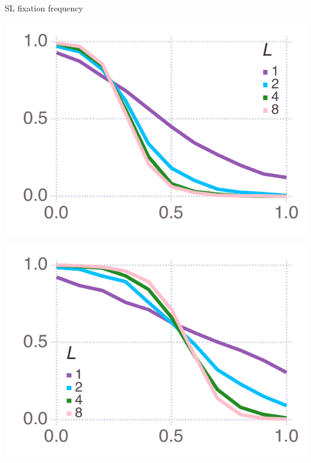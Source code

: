\documentclass[varwidth=true,crop=false]{standalone}
\begin{document}
    \begin{minipage}{3.75in}
    \begin{rotate}{90}
      {\parbox{3.0in}{
          \centering
          \vspace{-1.0em}\hspace{-2.5em}{\huge Low payoff $= 0.45$} \\[1em]
          {\huge SL fixation frequency}
      }}
    \end{rotate}%
    \hspace{2em}
      \includegraphics[width=\textwidth]{mean_social_learner_over_u_lowpayoff=0.45_nbehaviors=2.pdf}
	\end{minipage}\noindent\hspace{1.25em}
	\begin{minipage}{3.75in}%
      \includegraphics[width=\textwidth]{mean_social_learner_over_u_lowpayoff=0.45_nbehaviors=4.pdf}
    \end{minipage}\noindent
\end{document}
